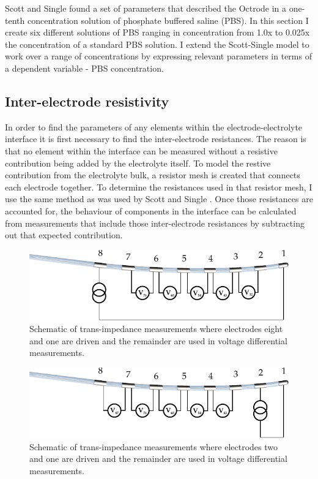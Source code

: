   Scott and Single found a set of parameters that described the Octrode in a one-tenth concentration solution of phosphate buffered saline (PBS).
  In this section I create six different solutions of PBS ranging in concentration from 1.0x to 0.025x the concentration of a standard PBS solution.
  I extend the Scott-Single model to work over a range of concentrations by expressing relevant parameters in terms of a dependent variable - PBS concentration.


  \subsection{Inter-electrode resistivity}


    In order to find the parameters of any elements within the electrode-electrolyte interface it is first necessary to find the inter-electrode resistances.
    The reason is that no element within the interface can be measured without a resistive contribution being added by the electrolyte itself.
    To model the restive contribution from the electrolyte bulk, a resistor mesh is created that connects each electrode together.
    To determine the resistances used in that resistor mesh, I use the same method as was used by Scott and Single \cite{Scott2014}.
    Once those resistances are accounted for, the behaviour of components in the interface can be calculated from measurements that include those inter-electrode resistances by subtracting out that expected contribution.

    \begin{figure}
      \centering
      \includegraphics{content/pt2/07-InterfaceModel/graphics/TransimpedanceMeasurements_Stim81}
      \caption{\label{fig:pt2-transimpedanceMeasurementDiagram_81Stim}Schematic of trans-impedance measurements where electrodes eight and one are driven and the remainder are used in voltage differential measurements.}
    \end{figure}

    \begin{figure}
      \centering
      \includegraphics{content/pt2/07-InterfaceModel/graphics/TransimpedanceMeasurements_Stim21}
      \caption{\label{fig:pt2-transimpedanceMeasurementDiagram_21Stim}Schematic of trans-impedance measurements where electrodes two and one are driven and the remainder are used in voltage differential measurements.}
    \end{figure}

